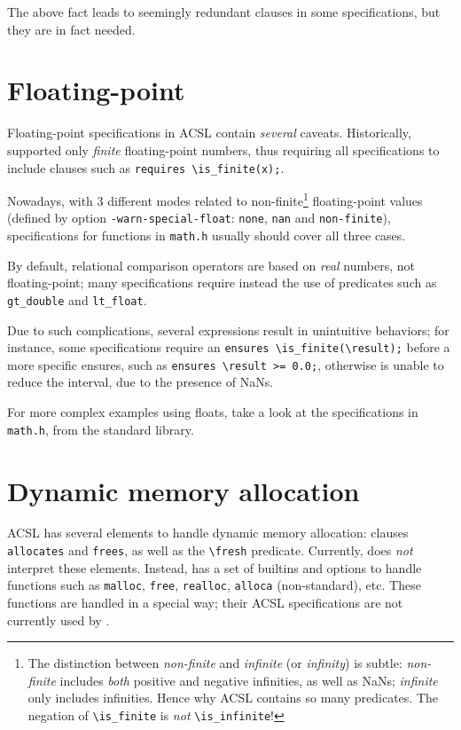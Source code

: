 \documentclass{frama-c-book}
\begin{document}
The above fact leads to seemingly redundant clauses in some specifications,
but they are in fact needed.

\section{Floating-point}
\label{sec:acsl-guide-float}

Floating-point specifications in ACSL contain {\em several} caveats.
Historically, \Eva{} supported only {\em finite} floating-point numbers,
thus requiring all specifications to include clauses such as
\verb+requires \is_finite(x);+.

Nowadays, with 3 different modes related to non-finite\footnote{%
The distinction between {\em non-finite} and {\em infinite}
(or {\em infinity}) is subtle: {\em non-finite} includes {\em both}
positive and negative infinities, as well as NaNs; {\em infinite} only
includes infinities. Hence why ACSL contains so many predicates.
The negation of \texttt{\textbackslash{}is\_finite} is {\em not}
\texttt{\textbackslash{}is\_infinite}!}
floating-point values (defined by option \texttt{-warn-special-float}:
\texttt{none}, \texttt{nan} and \texttt{non-finite}), specifications for
functions in \texttt{math.h} usually should cover all three cases.

By default, relational comparison operators are based on {\em real} numbers,
not floating-point; many specifications require instead the use of
predicates such as \verb+gt_double+ and \verb+lt_float+.

Due to such complications, several expressions result in unintuitive behaviors;
for instance, some specifications require an
\verb+ensures \is_finite(\result);+ before a more specific ensures, such as
\verb+ensures \result >= 0.0;+, otherwise \Eva{} is unable to reduce the interval,
due to the presence of NaNs.

For more complex examples using floats, take a look at the specifications in
\texttt{math.h}, from the \FramaC standard library.

\section{Dynamic memory allocation}

ACSL has several elements to handle dynamic memory allocation: clauses
\verb+allocates+ and \verb+frees+, as well as the \verb+\fresh+ predicate.
Currently, \Eva{} does {\em not} interpret these elements. Instead, \Eva{} has a set
of builtins and options to handle functions such as \texttt{malloc},
\texttt{free}, \texttt{realloc}, \texttt{alloca} (non-standard), etc.
These functions are handled in a special way; their ACSL specifications are not
currently used by \Eva{}.
\end{document}
